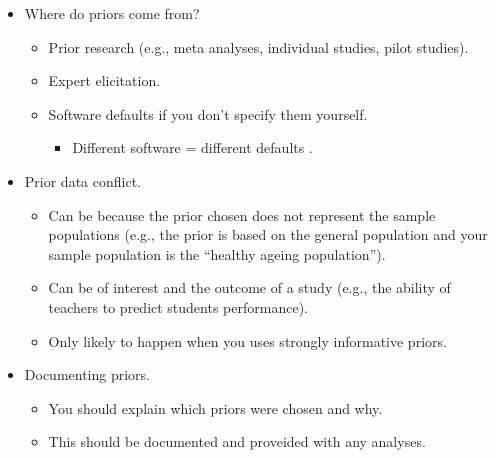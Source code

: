 \documentclass[
]{book}
\providecommand{\tightlist}{%
  \setlength{\itemsep}{0pt}\setlength{\parskip}{0pt}}
\begin{document}
\begin{itemize}
  \begin{itemize}
  \tightlist
  \item
    Priors need be specified before looking at the data as they will influence the results of any analyses.
  \item
    Strongly informative priors will result in a \emph{prior driven posterior} where the results will be closer to the prior than the likelihood.
  \item
    Weakly informative priors will result in a \emph{data driven posterior} where the reuslts will be close to the likelihood than the prior.
  \item
    Sample size is also important, the larger the sample, the larger the influce of the likelihood on the posterior.
  \item
    \url{https://www.rensvandeschoot.com/fbi-the-app/}
  \end{itemize}
\item
  Where do priors come from?

  \begin{itemize}
  \tightlist
  \item
    Prior research (e.g., meta analyses, individual studies, pilot studies).
  \item
    Expert elicitation.
  \item
    Software defaults if you don't specify them yourself.

    \begin{itemize}
    \tightlist
    \item
      Different software = different defaults \citep{vanErp2018}.
    \end{itemize}
  \end{itemize}
\item
  Prior data conflict.

  \begin{itemize}
  \tightlist
  \item
    Can be because the prior chosen does not represent the sample populations (e.g., the prior is based on the general population and your sample population is the ``healthy ageing population'').
  \item
    Can be of interest and the outcome of a study (e.g., the ability of teachers to predict students performance).
  \item
    Only likely to happen when you uses strongly informative priors.
  \end{itemize}
\item
  Documenting priors.

  \begin{itemize}
  \tightlist
  \item
    You should explain which priors were chosen and why.
  \item
    This should be documented and proveided with any analyses.
  \end{itemize}
\end{itemize}
\end{document}
